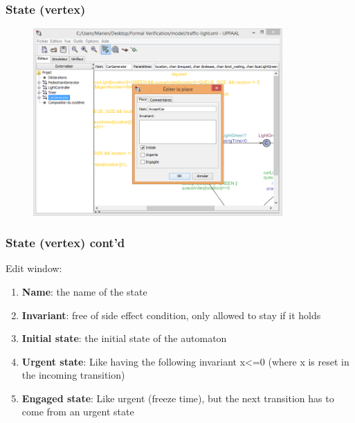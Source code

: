 \documentclass{beamer}
\begin{document}
\begin{frame}
	\frametitle{State (vertex)}
	\begin{figure}
    	\centering
    	\includegraphics[width = 0.85\textwidth]{uppaal_vertex_editor.png}
  	\end{figure}
\end{frame}

\begin{frame}
	\frametitle{State (vertex) cont'd}
	\begin{block}{Edit window:}
		\begin{enumerate}
			\item \textbf{Name}: the name of the state
			\item \textbf{Invariant}: free of side effect condition, only allowed to stay if it holds
			\item \textbf{Initial state}: the initial state of the automaton
			\item \textbf{Urgent state}: Like having the following invariant x<=0 (where x is reset in the incoming transition)
			\item \textbf{Engaged state}: Like urgent (freeze time), but the next transition has to come from an urgent state
		\end{enumerate}
	\end{block}
\end{frame}
\end{document}
